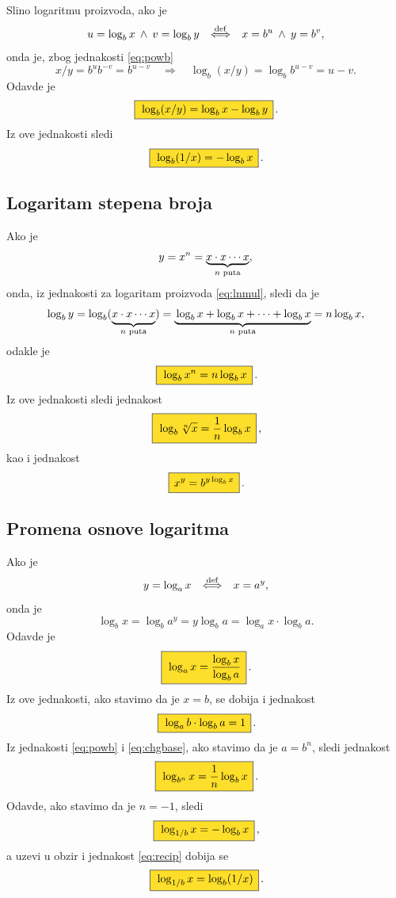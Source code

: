 \documentclass[12pt, twoside, a4paper]{article}
\def\land{\mathbin{\>\wedge\>}}
\def\loga{\log_a}
\def\logb{\log_b}
\def\okvir#1{\,\fcolorbox{black}{Goldenrod}{$\,\displaystyle{\mathstrut #1}\,$}\,}
\def\sledi{{\quad\Rightarrow\quad}}
\def\podef{{\quad\buildrel\rm def\over\Longleftrightarrow\quad}}
\begin{document}
Sli{\cv}no logaritmu proizvoda, 
ako je
$$
u=\logb x\land v=\log_b y \podef x=b^u\land y=b^v,
$$
onda je, zbog jednakosti \eqref{eq:powb}
$$
x/ y=b^ub^{-v}=b^{u-v}\sledi \logb(x/y)=\logb b^{u-v}=u-v.
$$
Odavde je
\begin{equation}
\okvir{\logb(x/ y)=\logb x-\logb y}.
\label{eq:lndiv}
\end{equation}
Iz ove jednakosti sledi
\begin{equation}
\okvir{\logb(1/x)=-\logb x}.
\label{eq:recip}
\end{equation}

\subsection{Logaritam stepena broja}

Ako je
$$
y=x^n=\underbrace{x\cdot x\cdots x}_{\text{$\mathstrut n$ puta}},
$$
onda, iz jednakosti za logaritam proizvoda \eqref{eq:lnmul}, sledi da je
$$
\logb y=\logb (\underbrace{\mathstrut x\cdot x\cdots x}_{\text{$n$ puta}})
=\underbrace{\mathstrut \logb x+\logb x+\cdots+\logb x}_{\text{$n$ puta}}
=n\logb x,
$$
odakle je
\begin{equation}
\okvir{\logb x^n=n\logb x}.
\label{eq:bpow}
\end{equation}
Iz ove jednakosti sledi jednakost
\begin{equation}
\okvir{\logb\sqrt[n] x=\frac1n\logb x},
\label{eq:lnroot}
\end{equation}
kao i jednakost
\begin{equation}
\okvir{x^y=b^{y\logb x}}.
\label{eq:power}
\end{equation}


\subsection{Promena osnove logaritma}

Ako je
$$
y = \loga x \podef x = a^y,
$$
onda je 
$$
\logb x=\logb a^y=y\logb a=\loga x\cdot\logb a.
$$
Odavde je
\begin{equation}
\okvir{\loga x=\frac{\logb x}{\logb a}}.
\label{eq:chgbase}
\end{equation}
Iz ove jednakosti, ako stavimo da je $x=b$, se dobija i jednakost
\begin{equation}
\okvir{\loga b\cdot\logb a = 1}.
\end{equation}
Iz jednakosti \eqref{eq:powb} i \eqref{eq:chgbase}, ako stavimo da je $a=b^n$, sledi jednakost
\begin{equation}
\okvir{\log_{b^n}x = \frac1n \logb x}.
\label{eq:powbase}
\end{equation}
Odavde, ako stavimo da je $n=-1$, sledi
\begin{equation}
\okvir{\log_{1/b}x = -\logb x},
\end{equation}
a uzev{\sv}i u obzir i jednakost \eqref{eq:recip} dobija se
\begin{equation}
\okvir{\log_{1/b}x = \logb(1/x)}.
\end{equation}
\end{document}
